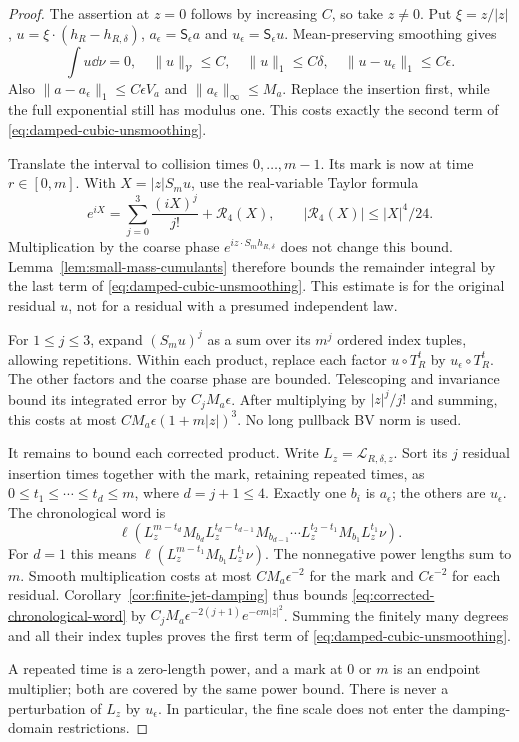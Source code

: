\begin{proof}
The assertion at $z=0$ follows by increasing $C$, so take $z\ne0$.
Put $\xi=z/|z|$, $u=\xi\cdot(h_R-h_{R,\delta})$,
$a_\epsilon=\mathsf S_\epsilon a$ and
$u_\epsilon=\mathsf S_\epsilon u$. Mean-preserving smoothing gives
\[
 \int u\dd\nu=0,\quad \|u\|_{\mathcal V}\le C,\quad
 \|u\|_1\le C\delta,\quad
 \|u-u_\epsilon\|_1\le C\epsilon.
\]
Also $\|a-a_\epsilon\|_1\le C\epsilon V_a$ and
$\|a_\epsilon\|_\infty\le M_a$. Replace the insertion first,
while the full exponential still has modulus one. This costs exactly
the second term of \eqref{eq:damped-cubic-unsmoothing}.

Translate the interval to collision times $0,\ldots,m-1$. Its mark
is now at time $r\in[0,m]$. With $X=|z|S_m u$, use the real-variable
Taylor formula
\begin{equation}\label{eq:cubic-phase-remainder}
 e^{iX}=\sum_{j=0}^3\frac{(iX)^j}{j!}+\mathcal R_4(X),
 \qquad |\mathcal R_4(X)|\le |X|^4/24.
\end{equation}
Multiplication by the coarse phase
$e^{iz\cdot S_m h_{R,\delta}}$ does not change this bound.
Lemma~\ref{lem:small-mass-cumulants} therefore bounds the remainder
integral by the last term of \eqref{eq:damped-cubic-unsmoothing}.
This estimate is for the original residual $u$, not for a residual
with a presumed independent law.

For $1\le j\le3$, expand $(S_m u)^j$ as a sum over its $m^j$
ordered index tuples, allowing repetitions. Within each product,
replace each factor $u\circ T_R^t$ by $u_\epsilon\circ T_R^t$.
The other factors and the coarse phase are bounded. Telescoping and
invariance bound its integrated error by $C_jM_a\epsilon$.
After multiplying by $|z|^j/j!$ and summing, this costs at most
$CM_a\epsilon(1+m|z|)^3$. No long pullback BV norm is used.

It remains to bound each corrected product. Write
$L_z=\mathcal L_{R,\delta,z}$. Sort its $j$ residual insertion times
together with the mark, retaining repeated times, as
$0\le t_1\le\cdots\le t_d\le m$, where $d=j+1\le4$.
Exactly one $b_i$ is $a_\epsilon$; the others are $u_\epsilon$.
The chronological word is
\begin{equation}\label{eq:corrected-chronological-word}
 \ell\!\left(
 L_z^{m-t_d}M_{b_d}L_z^{t_d-t_{d-1}}M_{b_{d-1}}
 \cdots L_z^{t_2-t_1}M_{b_1}L_z^{t_1}\nu\right).
\end{equation}
For $d=1$ this means
$\ell(L_z^{m-t_1}M_{b_1}L_z^{t_1}\nu)$.
The nonnegative power lengths sum to $m$. Smooth multiplication costs
at most $CM_a\epsilon^{-2}$ for the mark and $C\epsilon^{-2}$
for each residual. Corollary~\ref{cor:finite-jet-damping} thus bounds
\eqref{eq:corrected-chronological-word} by
$C_jM_a\epsilon^{-2(j+1)}e^{-cm|z|^2}$. Summing the finitely
many degrees and all their index tuples proves the first term of
\eqref{eq:damped-cubic-unsmoothing}.

A repeated time is a zero-length power, and a mark at $0$ or $m$
is an endpoint multiplier; both are covered by the same power bound.
There is never a perturbation of $L_z$ by $u_\epsilon$. In particular,
the fine scale does not enter the damping-domain restrictions.
\end{proof}

